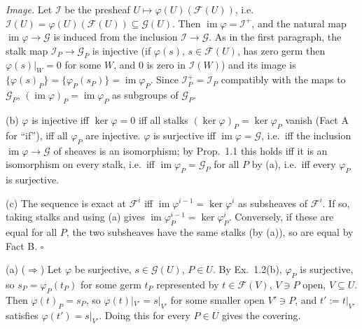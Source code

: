 \documentclass[11pt]{article}
\begin{document}
\emph{Image.} Let $\mathcal I$ be the presheaf $U\mapsto\varphi(U)(\mathcal F(U))$, i.e.\ $\mathcal I(U)=\varphi(U)(\mathcal F(U))\subseteq\mathcal G(U)$. Then $\operatorname{im}\varphi=\mathcal I^+$, and the natural map $\operatorname{im}\varphi\to\mathcal G$ is induced from the inclusion $\mathcal I\to\mathcal G$. As in the first paragraph, the stalk map $\mathcal I_P\to\mathcal G_P$ is injective (if $\varphi(s)$, $s\in \mathcal F(U)$, has zero germ then $\varphi(s)|_W=0$ for some $W$, and $0$ is zero in $\mathcal I(W)$) and its image is $\{\varphi(s)_P\}=\{\varphi_P(s_P)\}=\operatorname{im}\varphi_P$. Since $\mathcal I^+_P=\mathcal I_P$ compatibly with the maps to $\mathcal G_P$, $(\operatorname{im}\varphi)_P=\operatorname{im}\varphi_P$ as subgroups of $\mathcal G_P$.

(b) $\varphi$ is injective iff $\ker\varphi=0$ iff all stalks $(\ker\varphi)_P=\ker\varphi_P$ vanish (Fact A for ``if''), iff all $\varphi_P$ are injective. $\varphi$ is surjective iff $\operatorname{im}\varphi=\mathcal G$, i.e.\ iff the inclusion $\operatorname{im}\varphi\to\mathcal G$ of sheaves is an isomorphism; by Prop.~1.1 this holds iff it is an isomorphism on every stalk, i.e.\ iff $\operatorname{im}\varphi_P=\mathcal G_P$ for all $P$ by (a), i.e.\ iff every $\varphi_P$ is surjective.

(c) The sequence is exact at $\mathcal F^i$ iff $\operatorname{im}\varphi^{i-1}=\ker\varphi^i$ as subsheaves of $\mathcal F^i$. If so, taking stalks and using (a) gives $\operatorname{im}\varphi^{i-1}_P=\ker\varphi^i_P$. Conversely, if these are equal for all $P$, the two subsheaves have the same stalks (by (a)), so are equal by Fact B. \hfill$\square$

\pf
(a) ($\Rightarrow$) Let $\varphi$ be surjective, $s\in\mathcal G(U)$, $P\in U$. By Ex.~1.2(b), $\varphi_P$ is surjective, so $s_P=\varphi_P(t_P)$ for some germ $t_P$ represented by $t\in\mathcal F(V)$, $V\ni P$ open, $V\subseteq U$. Then $\varphi(t)_P=s_P$, so $\varphi(t)|_{V'}=s|_{V'}$ for some smaller open $V'\ni P$, and $t':=t|_{V'}$ satisfies $\varphi(t')=s|_{V'}$. Doing this for every $P\in U$ gives the covering.
\end{document}
